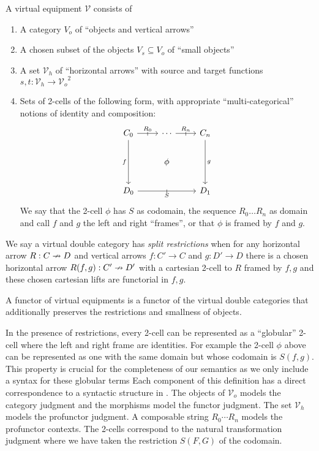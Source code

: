 \documentclass{llncs}
\begin{document}
\begin{definition}
  A virtual equipment $\mathcal V$ consists of
  \begin{enumerate}
  \item A category $V_o$ of ``objects and vertical arrows''
  \item A chosen subset of the objects $V_s \subseteq V_o$ of ``small objects''
  \item A set ${\mathcal V}_h$ of ``horizontal arrows'' with source
    and target functions $s,t : {\mathcal V}_h \to {\mathcal V_o}^2$
  \item Sets of 2-cells of the following form, 
    with appropriate ``multi-categorical'' notions of identity and
    composition:
\[\begin{tikzcd}%
	{C_0} & \cdots & {C_{n}} \\
	& \phi \\
	{D_0} && {D_1}
	\arrow["{R_n}", "\shortmid"{marking}, from=1-2, to=1-3]
	\arrow["f"', from=1-1, to=3-1]
	\arrow["g", from=1-3, to=3-3]
	\arrow["S"', "\shortmid"{marking}, from=3-1, to=3-3]
	\arrow["{R_0}", "\shortmid"{marking}, from=1-1, to=1-2]
\end{tikzcd}\]
    We say that the 2-cell $\phi$ has $S$ as codomain, the sequence
    $R_0 \ldots R_n$ as domain and call $f$ and $g$ the left and right
    ``frames'', or that $\phi$ is framed by $f$ and $g$.
  \end{enumerate}
  We say a virtual double category has \emph{split restrictions} when
  for any horizontal arrow $R : C \nrightarrow D$ and vertical arrows $f : C'
  \to C$ and $g : D' \to D$ there is a chosen horizontal arrow $R(f,g)
  : C' \nrightarrow D'$ with a cartesian 2-cell to $R$ framed by $f,g$ and
  these chosen cartesian lifts are functorial in $f,g$.
  
  A functor of virtual equipments is a functor of the virtual double
  categories that additionally preserves the restrictions and
  smallness of objects.
\end{definition}

In the presence of restrictions, every 2-cell can be represented as a
``globular'' 2-cell where the left and right frame are identities. For
example the 2-cell $\phi$ above can be represented as one with the
same domain but whose codomain is $S(f,g)$. This property is crucial
for the completeness of our semantics as we only include a syntax for these globular terms 
%
Each component of this definition has a direct correspondence to a
syntactic structure in \ohol{}. The objects of $\mathcal V_o$ models
the category judgment and the morphisms model the functor
judgment. The set $\mathcal V_h$ models the profunctor judgment. A
composable string $R_0 \cdots R_n$ models the profunctor contexts. The
2-cells correspond to the natural transformation judgment where we
have taken the restriction $S(F,G)$ of the codomain.
\end{document}
